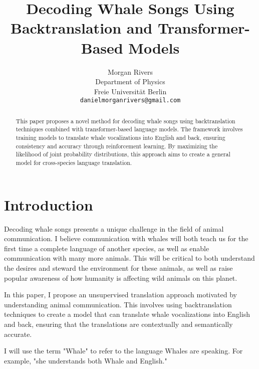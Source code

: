 \documentclass{article}
\title{Decoding Whale Songs Using Backtranslation and Transformer-Based Models}
\author{Morgan Rivers \\
        Department of Physics \\
        Freie Universität Berlin \\    
        \texttt{danielmorganrivers@gmail.com}
}
\begin{document}
\maketitle

\begin{abstract}
This paper proposes a novel method for decoding whale songs using backtranslation techniques combined with transformer-based language models. The framework involves training models to translate whale vocalizations into English and back, ensuring consistency and accuracy through reinforcement learning. By maximizing the likelihood of joint probability distributions, this approach aims to create a general model for cross-species language translation.
\end{abstract}

\section{Introduction}
Decoding whale songs presents a unique challenge in the field of animal communication. I believe communication with whales will both teach us for the first time a complete language of another species, as well as enable communication with many more animals. This will be critical to both understand the desires and steward the environment for these animals, as well as raise popular awareness of how humanity is affecting wild animals on this planet.

In this paper, I propose an unsupervised translation approach motivated by understanding animal communication. This involves using backtranslation techniques to create a model that can translate whale vocalizations into English and back, ensuring that the translations are contextually and semantically accurate.

I will use the term "Whale" to refer to the language Whales are speaking. For example, "she understands both Whale and English."
\end{document}
